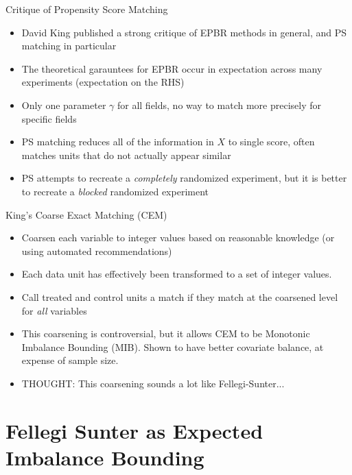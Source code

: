 \documentclass{beamer}
\begin{document}
\begin{frame}{Critique of Propensity Score Matching}
	\begin{itemize}
		\item David King published a strong critique of EPBR methods in general, and PS matching in particular
		\item The theoretical garauntees for EPBR occur in expectation across many experiments (expectation on the RHS)
		\item Only one parameter $\gamma$ for all fields, no way to match more precisely for specific fields
		\item PS matching reduces all of the information in $X$ to single score, often matches units that do not actually appear similar
		\item PS attempts to recreate a \emph{completely} randomized experiment, but it is better to recreate a \emph{blocked} randomized experiment
	\end{itemize}
\end{frame}



\begin{frame}{King's Coarse Exact Matching (CEM)}
	\begin{itemize}
		\item Coarsen each variable to integer values based on reasonable knowledge (or using automated recommendations)
		\item Each data unit has effectively been transformed to a set of integer values. 
		\item Call treated and control units a match if they match at the coarsened level for \emph{all} variables
		\item This coarsening is controversial, but it allows CEM to be Monotonic Imbalance Bounding (MIB). Shown to have better covariate balance, at expense of sample size.
		\item<2> THOUGHT: This coarsening sounds a lot like Fellegi-Sunter...
	\end{itemize}
\end{frame}

\section{Fellegi Sunter as Expected Imbalance Bounding}
\end{document}
